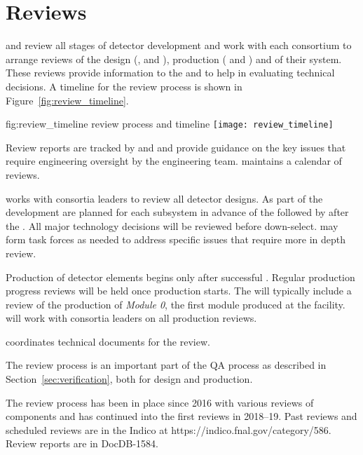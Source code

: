 \chapter{Reviews}
\label{vl:tc-review}

 and  review all stages of detector development
and work with each consortium to arrange reviews of the design
(,  and ), production (
and ) and  of their system.  These reviews
provide information to the  and  to help in
evaluating technical decisions. A timeline for the review process is
shown in Figure~\ref{fig:review_timeline}.
\begin{dunefigure}{fig:review_timeline}
  { review process and timeline}
  \texttt{[image: review\_timeline]}
\end{dunefigure}
Review reports are tracked by  and  and provide
guidance on the key issues that require engineering oversight by the
 engineering team.  maintains a calendar of
 reviews.

 works with consortia leaders to review all detector
designs.  As part of the  development  are
planned for each subsystem in advance of the  followed by
 after the .  All major technology decisions
will be reviewed before down-select.   may form task forces
as needed to address specific issues that require more in depth
review.


Production of detector elements begins only after successful
. Regular production progress reviews will be held once
production starts. The  will typically include a review of
the production of \textit{Module 0}, the first module produced at the
facility.  will work with consortia leaders on all
production reviews.

 coordinates technical documents for the 
 review.

The review process is an important part of the  QA process
as described in Section~\ref{sec:verification}, both for
design and production.

The review process has been in place since 2016 with various reviews
of  components and has continued into the first 
reviews in 2018--19. Past reviews and scheduled reviews are in the
 Indico at https://indico.fnal.gov/category/586.
Review reports are in DocDB-1584.

